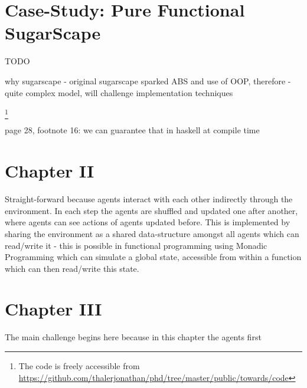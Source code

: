 \section{Case-Study: Pure Functional SugarScape}
TODO

why sugarscape
- original sugarscape sparked ABS and use of OOP, therefore 
- quite complex model, will challenge implementation techniques

\footnote{The code is freely accessible from \url{https://github.com/thalerjonathan/phd/tree/master/public/towards/code}}

\cite{weaver_replicating_nodate}

page 28, footnote 16: we can guarantee that in haskell at compile time

\section{Chapter II}
Straight-forward because agents interact with each other indirectly through the environment. In each step the agents are shuffled and updated one after another, where agents can see actions of agents updated before. This is implemented by sharing the environment as a shared data-structure amongst all agents which can read/write it - this is possible in functional programming using Monadic Programming which can simulate a global state, accessible from within a function which can then read/write this state. 

\section{Chapter III}
The main challenge begins here because in this chapter the agents first 